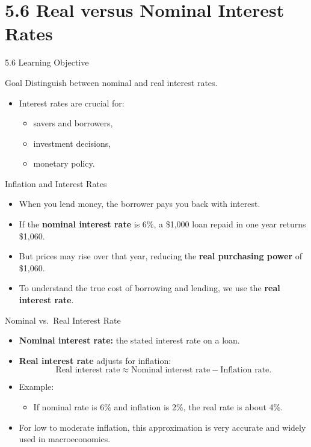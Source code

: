 \documentclass[aspectratio=169]{beamer}
\begin{document}
\section{5.6 Real versus Nominal Interest Rates}

\begin{frame}{5.6 Learning Objective}
\transfade
\begin{block}{Goal}
Distinguish between nominal and real interest rates.
\end{block}
\begin{itemize}[<+->]
  \item Interest rates are crucial for:
  \begin{itemize}[<+->]
    \item savers and borrowers,
    \item investment decisions,
    \item monetary policy.
  \end{itemize}
\end{itemize}
\end{frame}

\begin{frame}{Inflation and Interest Rates}
\transfade
\begin{itemize}[<+->]
  \item When you lend money, the borrower pays you back with interest.
  \item If the \textbf{nominal interest rate} is 6\%, a \$1,000 loan repaid in one year returns \$1,060.
  \item But prices may rise over that year, reducing the \textbf{real purchasing power} of \$1,060.
  \item To understand the true cost of borrowing and lending, we use the \textbf{real interest rate}.
\end{itemize}
\end{frame}

\begin{frame}{Nominal vs.\ Real Interest Rate}
\transfade
\begin{itemize}[<+->]
  \item \textbf{Nominal interest rate:} the stated interest rate on a loan.
  \item \textbf{Real interest rate} adjusts for inflation:
  \[
    \text{Real interest rate} \approx
    \text{Nominal interest rate} - \text{Inflation rate}.
  \]
  \item Example:
  \begin{itemize}[<+->]
    \item If nominal rate is 6\% and inflation is 2\%, the real rate is about 4\%.
  \end{itemize}
  \item For low to moderate inflation, this approximation is very accurate and widely used in macroeconomics.
\end{itemize}
\end{frame}
\end{document}
